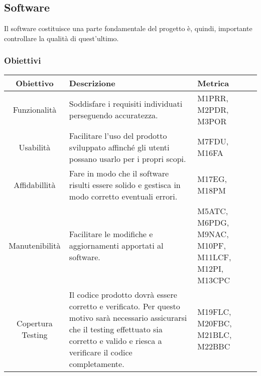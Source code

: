 \subsection{Software}
Il software costituisce una parte fondamentale del progetto è, quindi, importante controllare la qualità di quest'ultimo.

\subsubsection{Obiettivi}
\begin{center}
	\renewcommand{\arraystretch}{1.8}
	\begin{tabular}{ |c|m{20em}|m{8em}|}
		\hline
		\textbf{Obiettivo} & \textbf{Descrizione} & \textbf{Metrica} \\
		\hline
		Funzionalità & Soddisfare i requisiti individuati \newline perseguendo accuratezza. & M1PRR, M2PDR, M3POR \\
		\hline
		Usabilità & Facilitare l'uso del prodotto sviluppato affinché gli utenti possano usarlo per i propri scopi. & M7FDU, M16FA \\
    \hline
		Affidabillità & Fare in modo che il software risulti essere solido e gestisca in modo corretto eventuali errori. & M17EG, M18PM \\
		\hline
		Manutenibilità & Facilitare le modifiche e aggiornamenti \newline apportati al \newline software. & M5ATC, M6PDG, M9NAC, M10PF, M11LCF, M12PI, M13CPC \\
		\hline
    Copertura Testing & Il codice prodotto dovrà essere corretto \newline e verificato. Per questo motivo sarà \newline necessario assicurarsi che il testing 
    \newline effettuato sia corretto e valido e riesca a \newline verificare il codice completamente. & M19FLC, M20FBC, M21BLC, M22BBC \\
		\hline
	\end{tabular}
\end{center}

